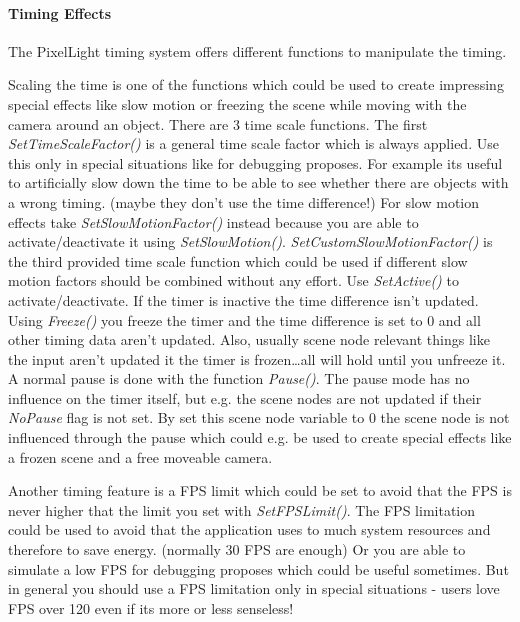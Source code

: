 \paragraph{Timing Effects}
The PixelLight timing system offers different functions to manipulate the timing.

Scaling the time is one of the functions which could be used to create impressing special effects like slow motion or freezing the scene while moving with the camera around an object. There are 3 time scale functions. The first \emph{SetTimeScaleFactor()} is a general time scale factor which is always applied. Use this only in special situations like for debugging proposes. For example its useful to artificially slow down the time to be able to see whether there are objects with a wrong timing. (maybe they don't use the time difference!) For slow motion effects take \emph{SetSlowMotionFactor()} instead because you are able to activate/deactivate it using \emph{SetSlowMotion()}. \emph{SetCustomSlowMotionFactor()} is the third provided time scale function which could be used if different slow motion factors should be combined without any effort. Use \emph{SetActive()} to activate/deactivate. If the timer is inactive the time difference isn't updated. Using \emph{Freeze()} you freeze the timer and the time difference is set to 0 and all other timing data aren't updated. Also, usually scene node relevant things like the input aren't updated it the timer is frozen\ldots all will hold until you unfreeze it. A normal pause is done with the function \emph{Pause()}. The pause mode has no influence on the timer itself, but e.g. the scene nodes are not updated if their \emph{NoPause} flag is not set. By set this scene node variable to 0 the scene node is not influenced through the pause which could e.g. be used to create special effects like a frozen scene and a free moveable camera.

Another timing feature is a FPS limit which could be set to avoid that the FPS is never higher that the limit you set with \emph{SetFPSLimit()}. The FPS limitation could be used to avoid that the application uses to much system resources and therefore to save energy. (normally 30 FPS are enough) Or you are able to simulate a low FPS for debugging proposes which could be useful sometimes. But in general you should use a FPS limitation only in special situations - users love FPS over 120 even if its more or less senseless!






